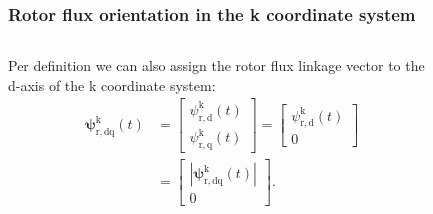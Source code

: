 \begin{frame}
	\frametitle{Rotor flux orientation in the k coordinate system}
    \begin{columns}
		\begin{column}{0.5\textwidth}
	       Per definition we can also assign the rotor flux linkage vector to the d-axis of the k coordinate system:
              \begin{equation}
                \renewcommand{\arraystretch}{1.4}
                \begin{split}
                 \bm{\psi}^\mathrm{k}_\mathrm{r,dq}(t) &= \begin{bmatrix} \psi_{\mathrm{r,d}}^\mathrm{k}(t) \\ \psi_{\mathrm{r,q}}^\mathrm{k}(t) \end{bmatrix} = \begin{bmatrix} \psi_{\mathrm{r,d}}^\mathrm{k}(t) \\ 0 \end{bmatrix}\\
                 &= \begin{bmatrix}|\bm{\psi}^\mathrm{k}_\mathrm{r,dq}(t)| \\ 0 \end{bmatrix}.
                \end{split}
              \end{equation}
        \end{column}
        \begin{column}{0.5\textwidth}
            \begin{figure}
                \centering

\end{figure}
\end{column}
\end{columns}
\end{frame}
